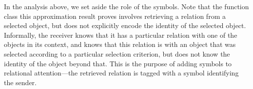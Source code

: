 In the analysis above, we set aside the role of the symbols. Note that the function class this approximation result proves involves retrieving a relation from a selected object, but does not explicitly encode the identity of the selected object. Informally, the receiver knows that it has a particular relation with one of the objects in its context, and knows that this relation is with an object that was selected according to a particular selection criterion, but does not know the identity of the object beyond that. This is the purpose of adding symbols to relational attention---the retrieved relation is tagged with a symbol identifying the sender.
